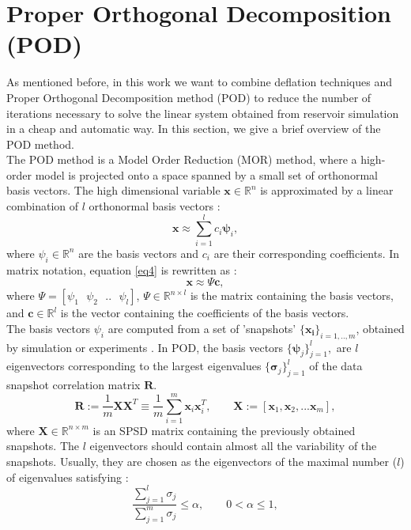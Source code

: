 \documentclass[review]{elsarticle}
\begin{document}
\section{Proper Orthogonal Decomposition (POD)}\label{POD}
As mentioned before, in this work we want to combine deflation techniques and Proper Orthogonal Decomposition method (POD) to reduce the number of iterations necessary to solve the linear system obtained from reservoir simulation in a cheap and automatic way. In this section, we give a brief overview of the POD method.\\
The POD method is a Model Order Reduction (MOR) method, where a high-order model is projected onto a space
spanned by a small set of orthonormal basis vectors.
The high dimensional variable $\mathbf{x} \in \mathbb{R}^n$
is approximated by a linear combination of $l$ orthonormal basis vectors \cite{Astrid11}:
\begin{equation}\label{eq4}
  \mathbf{x}\approx \sum_{i=1}^lc_i \mathbf{\psi}_i,
\end{equation}
where $\psi_i \in \mathbb{R}^n$ are the basis vectors and $c_i$ are their corresponding coefficients.
In matrix notation, equation \eqref{eq4} is rewritten as :
$$\mathbf{x}\approx \Psi\mathbf{c},$$
where $\Psi=[\psi_1 \text{ }\psi_2 \text{ }.. \text{ }\psi_l]$, $\Psi \in \mathbb{R}^{n\times l}$ 
is the matrix containing the basis vectors, and $\mathbf{c} \in \mathbb{R}^l$ is the vector 
containing the coefficients of the basis vectors. \\
The basis vectors $\psi_i$ are computed from a set of 'snapshots' $\{ \mathbf{x_i}\} _{i=1,..,m}$, 
obtained by simulation or experiments \cite{Mark06}. 
In POD, the basis vectors $\{ \mathbf{\psi} _j \} ^l _{j=1},$ are $l$ eigenvectors corresponding to 
the largest eigenvalues $\{ \mathbf{\sigma} _j \} ^l _{j=1}$ of the data snapshot correlation matrix $\mathbf{R}$.
\begin{equation}\label{eq:POD}
\mathbf{R}:= \frac{1}{m}\mathbf{X}\mathbf{X}^T \equiv \frac{1}{m} \sum_{i=1}^m \mathbf{x}_i \mathbf{x}_i^T,
\qquad \mathbf{X}:=[\mathbf{x}_1,\mathbf{x}_2,...\mathbf{x}_m],
\end{equation}
where $\mathbf{X}\in \mathbb{R}^{n\times m}$ is an SPSD matrix containing the previously obtained snapshots.
The $l$ eigenvectors should contain almost all the variability of the snapshots. 
Usually, they are chosen as the eigenvectors of the maximal number ($l$) of eigenvalues satisfying \cite{Mark06}:
\begin{equation}
\frac{\sum_{j=1}^l\sigma_j}{\sum_{j=1}^m\sigma_j}\leq \alpha, \qquad 0<\alpha \leq 1,
\end{equation}
\end{document}
